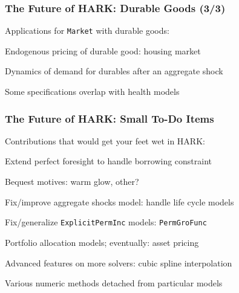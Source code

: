   \begin{frame}
    \frametitle{The Future of HARK: Durable Goods (3/3)}
    Applications for \texttt{Market} with durable goods:
    \bi
  \item Endogenous pricing of durable good: housing market

  \item Dynamics of demand for durables after an aggregate shock

  \item Some specifications overlap with health models
    \ei

    \hyperlink{DiscussionTopics}{}
  \end{frame}



  \begin{frame}\label{StructuralChanges}
    \frametitle{The Future of HARK: Small To-Do Items}
    Contributions that would get your feet wet in HARK:
    \bi
  \item <1->Extend perfect foresight to handle borrowing constraint

  \item <1->Bequest motives: warm glow, other?

  \item <2->Fix/improve aggregate shocks model: handle life cycle models

  \item <2->Fix/generalize \texttt{ExplicitPermInc} models: \texttt{PermGroFunc}

  \item <2->Portfolio allocation models; eventually: asset pricing

  \item <3->Advanced features on more solvers: cubic spline interpolation

  \item <3->Various numeric methods detached from particular models
    \ei
  \end{frame}


